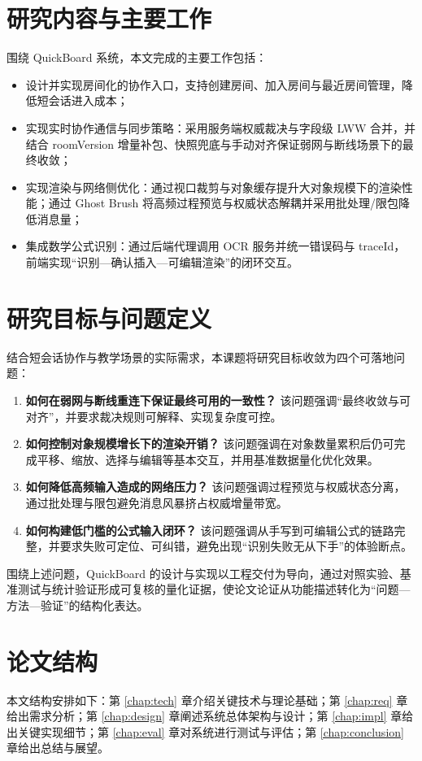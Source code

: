 \section{研究内容与主要工作}
围绕 QuickBoard 系统，本文完成的主要工作包括：
\begin{itemize}
  \item 设计并实现房间化的协作入口，支持创建房间、加入房间与最近房间管理，降低短会话进入成本；
  \item 实现实时协作通信与同步策略：采用服务端权威裁决与字段级 LWW 合并，并结合 roomVersion 增量补包、快照兜底与手动对齐保证弱网与断线场景下的最终收敛；
  \item 实现渲染与网络侧优化：通过视口裁剪与对象缓存提升大对象规模下的渲染性能；通过 Ghost Brush 将高频过程预览与权威状态解耦并采用批处理/限包降低消息量；
  \item 集成数学公式识别：通过后端代理调用 OCR 服务并统一错误码与 traceId，前端实现“识别—确认插入—可编辑渲染”的闭环交互。
\end{itemize}

\section{研究目标与问题定义}
结合短会话协作与教学场景的实际需求，本课题将研究目标收敛为四个可落地问题：
\begin{enumerate}
  \item \textbf{如何在弱网与断线重连下保证最终可用的一致性？} 该问题强调“最终收敛与可对齐”，并要求裁决规则可解释、实现复杂度可控。
  \item \textbf{如何控制对象规模增长下的渲染开销？} 该问题强调在对象数量累积后仍可完成平移、缩放、选择与编辑等基本交互，并用基准数据量化优化效果。
  \item \textbf{如何降低高频输入造成的网络压力？} 该问题强调过程预览与权威状态分离，通过批处理与限包避免消息风暴挤占权威增量带宽。
  \item \textbf{如何构建低门槛的公式输入闭环？} 该问题强调从手写到可编辑公式的链路完整，并要求失败可定位、可纠错，避免出现“识别失败无从下手”的体验断点。
\end{enumerate}
围绕上述问题，QuickBoard 的设计与实现以工程交付为导向，通过对照实验、基准测试与统计验证形成可复核的量化证据，使论文论证从功能描述转化为“问题—方法—验证”的结构化表达。

\section{论文结构}
本文结构安排如下：第 \ref{chap:tech} 章介绍关键技术与理论基础；第 \ref{chap:req} 章给出需求分析；第 \ref{chap:design} 章阐述系统总体架构与设计；第 \ref{chap:impl} 章给出关键实现细节；第 \ref{chap:eval} 章对系统进行测试与评估；第 \ref{chap:conclusion} 章给出总结与展望。
